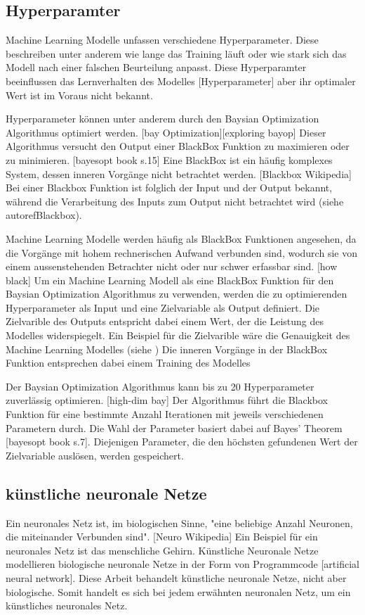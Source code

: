 \subsection{Hyperparamter}
\label{sub:t_ml_hyper}
Machine Learning Modelle unfassen verschiedene Hyperparameter. Diese beschreiben
unter anderem wie lange das Training läuft oder wie stark sich das Modell nach
einer falschen Beurteilung anpasst. Diese Hyperparamter beeinflussen das
Lernverhalten des Modelles [Hyperparameter] aber ihr optimaler Wert ist im
Voraus nicht bekannt. 

Hyperparameter können unter anderem durch den Baysian Optimization Algorithmus
optimiert werden. [bay Optimization][exploring bayop] Dieser Algorithmus
versucht den Output einer BlackBox Funktion zu maximieren oder zu minimieren.
[bayesopt book s.15] Eine BlackBox ist ein häufig komplexes System, dessen inneren
Vorgänge nicht betrachtet werden. [Blackbox Wikipedia] Bei einer Blackbox
Funktion ist folglich der Input und der Output bekannt, während die Verarbeitung
des Inputs zum Output nicht betrachtet wird (siehe autoref{Blackbox}).


Machine Learning Modelle werden häufig als BlackBox Funktionen angesehen, da die
Vorgänge mit hohem rechnerischen Aufwand verbunden sind, wodurch sie von einem
aussenstehenden Betrachter nicht oder nur schwer erfassbar sind. [how black] Um ein Machine
Learning Modell als eine BlackBox Funktion für den Baysian Optimization
Algorithmus zu verwenden, werden die zu optimierenden Hyperparameter als Input
und eine Zielvariable als Output definiert. Die Zielvarible des Outputs
entspricht dabei einem Wert, der die Leistung des Modelles widerspiegelt. Ein
Beispiel für die Zielvarible wäre die Genauigkeit des Machine Learning Modelles
(siehe ) Die inneren Vorgänge in der BlackBox Funktion
entsprechen dabei einem Training des Modelles

Der Baysian Optimization Algorithmus kann bis zu 20 Hyperparameter zuverlässig
optimieren. [high-dim bay] Der Algorithmus führt die Blackbox Funktion für eine
bestimmte Anzahl Iterationen mit jeweils verschiedenen Parametern durch. Die
Wahl der Parameter basiert dabei auf Bayes' Theorem [bayesopt book s.7].
Diejenigen Parameter, die den höchsten gefundenen Wert der Zielvariable
auslösen, werden gespeichert.


\subsection{künstliche neuronale Netze}
\label{sub:t_ml_nn}
Ein neuronales Netz ist, im biologischen Sinne, "eine beliebige Anzahl Neuronen,
die miteinander Verbunden sind". [Neuro Wikipedia] Ein Beispiel für ein
neuronales Netz ist das menschliche Gehirn. Künstliche Neuronale Netze
modellieren biologische neuronale Netze in der Form von Programmcode [artificial
neural network]. Diese Arbeit behandelt künstliche neuronale Netze, nicht aber
biologische. Somit handelt es sich bei jedem erwähnten neuronalen Netz, um ein
künstliches neuronales Netz.

